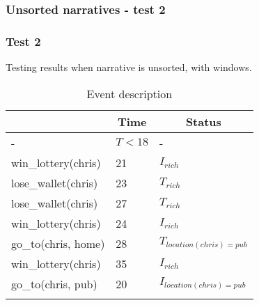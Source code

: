 \documentclass[8pt]{beamer}
\begin{document}
\begin{frame}
    \frametitle{Unsorted narratives - test 2}
    \subsubsection{Test 2}
    \small
    Testing results when narrative is unsorted, with windows.\linebreak
    \begin{minipage}{0.48\linewidth}
        \begin{table}[t!]
            \caption{Event description}
            \begin{center}

                \begin{tabular}{lll}
                    \hline\noalign{\smallskip}
                    \multicolumn{1}{l}{\textbf{Event}} & \multicolumn{1}{c}{\textbf{Time}} & \multicolumn{1}{c}{\textbf{Status}}  \\
                    \hline
                    - & $T<18$ & -\\
                    \hline
                    win\_lottery(chris)&21 &$I_{rich}$\\
                    lose\_wallet(chris)& 23 &$T_{rich}$\\
                    lose\_wallet(chris)& 27 &$T_{rich}$\\
                    \hline
                    win\_lottery(chris)& 24 &$I_{rich}$\\
                    go\_to(chris, home)& 28 &$T_{location(chris)=pub}$\\
                    win\_lottery(chris)& 35&$I_{rich}$\\
                    go\_to(chris, pub)& 20 & $I_{location(chris)=pub}$\\
                    \noalign{\smallskip}
                    \hline
                \end{tabular}
            \end{center}
        \end{table}
    \end{minipage}
    \begin{minipage}{0.48\linewidth}


\end{minipage}
\end{frame}
\end{document}
